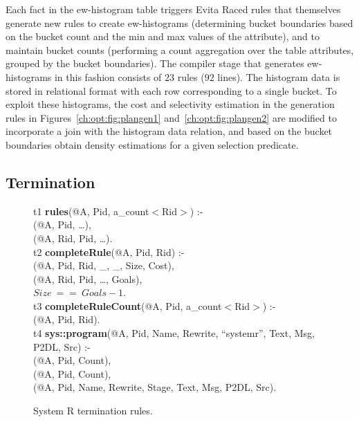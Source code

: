 Each fact in the ew-histogram table triggers Evita Raced rules that themselves
generate new rules to create ew-histograms (determining bucket boundaries based
on the bucket count and the min and max values of the attribute), and to
maintain bucket counts (performing a count aggregation over the table
attributes, grouped by the bucket boundaries).  The compiler stage that
generates ew-histograms in this fashion consists of $23$ rules ($92$ lines).
The histogram data is stored in relational format with each row corresponding
to a single bucket.  To exploit these histograms, the cost and selectivity
estimation in the  generation rules in
Figures~\ref{ch:opt:fig:plangen1} and~\ref{ch:opt:fig:plangen2} are modified to
incorporate a join with the histogram data relation, and based on the bucket
boundaries obtain density estimations for a given selection predicate.

\subsection{Termination}
\label{ch:opt:sec:termination}

\begin{figure*}
\ssp
\centering
\begin{boxedminipage}{\linewidth}
t1 {\bf rules}(@A, Pid, a\_count$<$Rid$>$) :-\\
(@A, Pid, \ldots), \\
(@A, Rid, Pid, \ldots). \\

t2 {\bf completeRule}(@A, Pid, Rid) :- \\
(@A, Pid, Rid, \_, \_, Size, Cost), \\
(@A, Rid, Pid, \ldots, Goals), \\
\datalogspace $Size\ ==\ Goals - 1$. \\

t3 {\bf completeRuleCount}(@A, Pid, a\_count$<$Rid$>$) :- \\
(@A, Pid, Rid). \\

t4 {\bf sys::program}(@A, Pid, Name, Rewrite, ``systemr'', Text, Msg, P2DL, Src) :- \\
(@A, Pid, Count), \\
(@A, Pid, Count), \\
(@A, Pid, Name, Rewrite, Stage, Text, Msg, P2DL, Src).

\end{boxedminipage}
\caption{\label{ch:opt:fig:systemrend}System R termination rules.}
\end{figure*}

